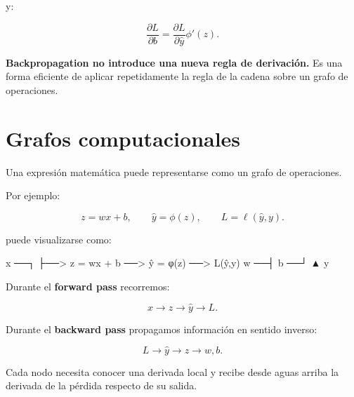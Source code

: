 \documentclass[
  letterpaper,
  DIV=11,
  numbers=noendperiod]{scrartcl}
\newenvironment{Shaded}{\begin{snugshade}}{\end{snugshade}}
\newcommand{\NormalTok}[1]{\textcolor[rgb]{0.00,0.23,0.31}{#1}}
\begin{document}
y:

\[
\boxed{
\frac{\partial L}{\partial b}
=
\frac{\partial L}{\partial\hat y}
\phi'(z).
}
\]

\begin{tcolorbox}[enhanced jigsaw, arc=.35mm, bottomrule=.15mm, bottomtitle=1mm, breakable, colback=white, colbacktitle=quarto-callout-important-color!10!white, colframe=quarto-callout-important-color-frame, coltitle=black, left=2mm, leftrule=.75mm, opacityback=0, opacitybacktitle=0.6, rightrule=.15mm, title=\textcolor{quarto-callout-important-color}{\faExclamation}\hspace{0.5em}{Important}, titlerule=0mm, toprule=.15mm, toptitle=1mm]

\textbf{Backpropagation no introduce una nueva regla de derivación.} Es
una forma eficiente de aplicar repetidamente la regla de la cadena sobre
un grafo de operaciones.

\end{tcolorbox}

\section{Grafos computacionales}\label{grafos-computacionales}

Una expresión matemática puede representarse como un grafo de
operaciones.

Por ejemplo:

\[
z=wx+b,
\qquad
\hat y=\phi(z),
\qquad
L=\ell(\hat y,y).
\]

puede visualizarse como:

\begin{Shaded}
\begin{Highlighting}[]
\NormalTok{x ──┐}
\NormalTok{    ├──\textgreater{} z = wx + b ──\textgreater{} ŷ = φ(z) ──\textgreater{} L(ŷ,y)}
\NormalTok{w ──┤}
\NormalTok{b ──┘                              ▲}
\NormalTok{                                  y}
\end{Highlighting}
\end{Shaded}

Durante el \textbf{forward pass} recorremos:

\[
x
\rightarrow
z
\rightarrow
\hat y
\rightarrow
L.
\]

Durante el \textbf{backward pass} propagamos información en sentido
inverso:

\[
L
\rightarrow
\hat y
\rightarrow
z
\rightarrow
w,b.
\]

Cada nodo necesita conocer una derivada local y recibe desde aguas
arriba la derivada de la pérdida respecto de su salida.
\end{document}
